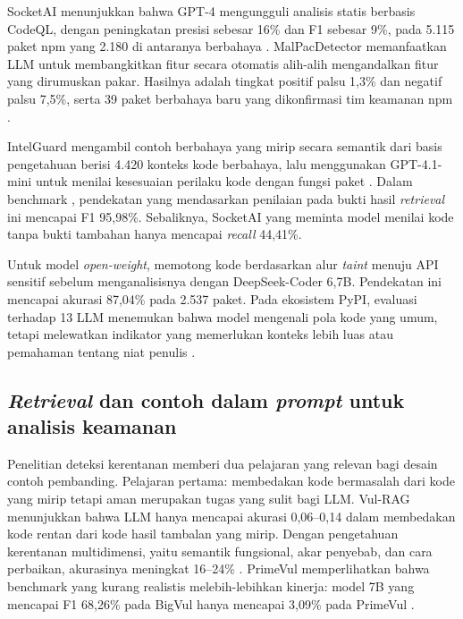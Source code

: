\documentclass[a4paper,fleqn]{cas-dc}
\begin{document}
SocketAI menunjukkan bahwa GPT-4 mengungguli analisis statis berbasis CodeQL,
dengan peningkatan presisi sebesar 16\% dan F1 sebesar 9\%, pada 5.115 paket npm
yang 2.180 di antaranya berbahaya \citep{zahan2025leveraging}. MalPacDetector
memanfaatkan LLM untuk membangkitkan fitur secara otomatis alih-alih mengandalkan
fitur yang dirumuskan pakar. Hasilnya adalah tingkat positif palsu 1,3\% dan
negatif palsu 7,5\%, serta 39 paket berbahaya baru yang dikonfirmasi tim keamanan
npm \citep{wang2025malpacdetector}.

IntelGuard mengambil contoh berbahaya yang mirip secara semantik dari basis
pengetahuan berisi 4.420 konteks kode berbahaya, lalu menggunakan GPT-4.1-mini
untuk menilai kesesuaian perilaku kode dengan fungsi paket
\citep{guo2026bridging}. Dalam benchmark \citet{guo2026effective}, pendekatan
yang mendasarkan penilaian pada bukti hasil \emph{retrieval} ini mencapai F1
95,98\%. Sebaliknya, SocketAI yang meminta model menilai kode tanpa bukti
tambahan hanya mencapai \emph{recall} 44,41\%.

Untuk model \emph{open-weight}, \citet{nguyen2025taint} memotong kode berdasarkan
alur \emph{taint} menuju API sensitif sebelum menganalisisnya dengan
DeepSeek-Coder 6,7B. Pendekatan ini mencapai akurasi 87,04\% pada 2.537 paket.
Pada ekosistem PyPI, evaluasi terhadap 13 LLM menemukan bahwa model mengenali
pola kode yang umum, tetapi melewatkan indikator yang memerlukan konteks lebih
luas atau pemahaman tentang niat penulis \citep{ryan2026evaluation}.

\subsection{\emph{Retrieval} dan contoh dalam \emph{prompt} untuk analisis keamanan}

Penelitian deteksi kerentanan memberi dua pelajaran yang relevan bagi desain
contoh pembanding. Pelajaran pertama: membedakan kode bermasalah dari kode yang
mirip tetapi aman merupakan tugas yang sulit bagi LLM. Vul-RAG menunjukkan bahwa
LLM hanya mencapai akurasi 0,06--0,14 dalam membedakan kode rentan dari kode
hasil tambalan yang mirip. Dengan pengetahuan kerentanan multidimensi, yaitu
semantik fungsional, akar penyebab, dan cara perbaikan, akurasinya meningkat
16--24\% \citep{du2026vulrag}. PrimeVul memperlihatkan bahwa benchmark yang kurang
realistis melebih-lebihkan kinerja: model 7B yang mencapai F1 68,26\% pada BigVul
hanya mencapai 3,09\% pada PrimeVul \citep{ding2025vulnerability}.
\end{document}
